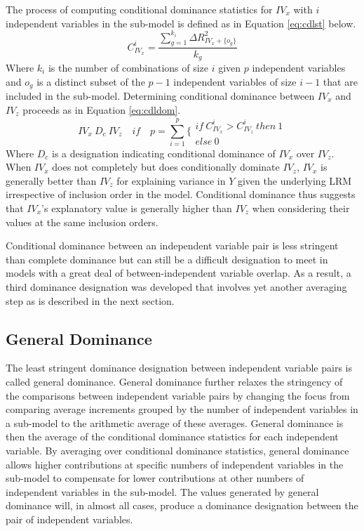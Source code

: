 \documentclass[man]{apa7}
\begin{document}
	The process of computing conditional dominance statistics for $IV_x$ with $i$ independent variables in the sub-model is defined as in Equation \ref{eq:cdlst} below.
	\begin{equation}
		C^{i}_{IV_x} = \frac{\sum^{k_i}_{g=1} \Delta R^2_{IV_x + \{o_g\}}}{k_g}
		\label{eq:cdlst}
	\end{equation}
	Where $k_i$ is the number of combinations of size $i$ given $p$ independent variables and $o_g$ is a distinct subset of the $p - 1$ independent variables of size $i - 1$ that are included in the sub-model.	
	Determining conditional dominance between $IV_x$ and $IV_z$ proceeds as in Equation \ref{eq:cdldom}.
	\begin{equation}
		IV_x \ D_c \ IV_z \quad if \quad p = \sum^p_{i=1} \Biggl\{ 
		\begin{array}{l}
			if \ C^{i}_{IV_x} > C^{i}_{IV_z} \ then \ 1 \\ 
			else \ 0 
		\end{array}
		\label{eq:cdldom}
	\end{equation}
	Where $D_c$ is a designation indicating conditional dominance of $IV_x$ over $IV_z$.	
	When $IV_x$ does not completely but does conditionally dominate $IV_z$, $IV_x$ is generally better than $IV_z$ for explaining variance in $Y$ given the underlying LRM irrespective of inclusion order in the model.
	Conditional dominance thus suggests that $IV_x$'s explanatory value is generally higher than $IV_z$ when considering their values at the same inclusion orders.
	
	Conditional dominance between an independent variable pair is less stringent than complete dominance but can still be a difficult designation to meet in models with a great deal of between-independent variable overlap.
	As a result, a third dominance designation was developed that involves yet another averaging step as is described in the next section.
	
	\subsection{General Dominance}
	
	The least stringent dominance designation between independent variable pairs is called general dominance.
	General dominance further relaxes the stringency of the comparisons between independent variable pairs by changing the focus from comparing average increments grouped by the number of independent variables in a sub-model to the arithmetic average of these averages.
	General dominance is then the average of the conditional dominance statistics for each independent variable.
	By averaging over conditional dominance statistics, general dominance allows higher contributions at specific numbers of independent variables in the sub-model to compensate for lower contributions at other numbers of independent variables in the sub-model. 
	The values generated by general dominance will, in almost all cases, produce a dominance designation between the pair of independent variables.
	
\end{document}
